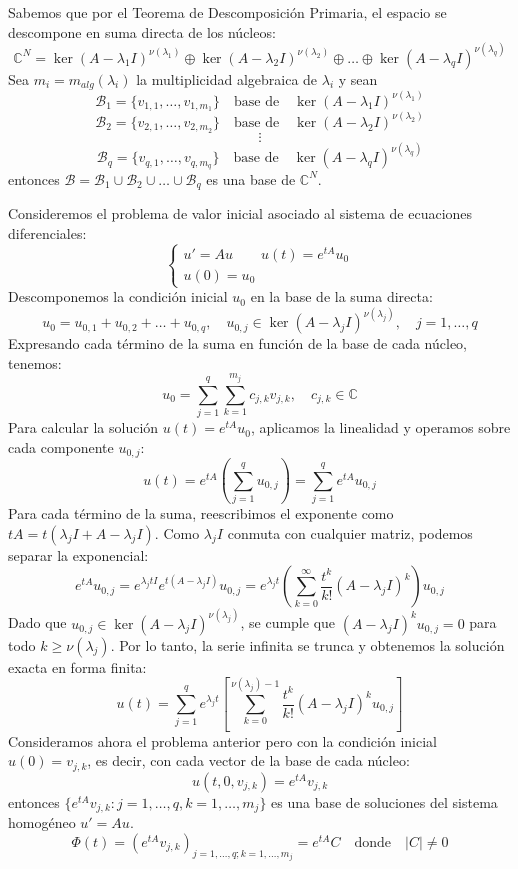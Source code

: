 Sabemos que por el Teorema de Descomposición Primaria, el espacio se descompone en suma directa de los núcleos:
\[
    \mathbb{C}^N = \ker(A - \lambda_1 I)^{\nu(\lambda_1)} \oplus \ker(A - \lambda_2 I)^{\nu(\lambda_2)} \oplus \dots \oplus \ker(A - \lambda_q I)^{\nu(\lambda_q)}
\]
Sea $m_i = m_{alg}(\lambda_i)$ la multiplicidad algebraica de $\lambda_i$ y sean
\[
    \mathcal{B}_1 = \{v_{1,1}, \dots, v_{1,m_1}\} \quad \text{base de} \quad \ker(A - \lambda_1 I)^{\nu(\lambda_1)}
\]
\[
    \mathcal{B}_2 = \{v_{2,1}, \dots, v_{2,m_2}\} \quad \text{base de} \quad \ker(A - \lambda_2 I)^{\nu(\lambda_2)}
\]
\[
    \vdots
\]
\[
    \mathcal{B}_q = \{v_{q,1}, \dots, v_{q,m_q}\} \quad \text{base de} \quad \ker(A - \lambda_q I)^{\nu(\lambda_q)}
\]
entonces $\mathcal{B} = \mathcal{B}_1 \cup \mathcal{B}_2 \cup \dots \cup \mathcal{B}_q$ es una base de $\mathbb{C}^N$.

Consideremos el problema de valor inicial asociado al sistema de ecuaciones diferenciales:
\[
    \begin{cases}
        u' = A u \qquad u(t) = e^{tA} u_0 \\
        u(0) = u_0
    \end{cases}
\]
Descomponemos la condición inicial $u_0$ en la base de la suma directa:
\[
    u_0 = u_{0,1} + u_{0,2} + \dots + u_{0,q}, \quad u_{0,j} \in \ker(A - \lambda_j I)^{\nu(\lambda_j)}, \quad j = 1, \dots, q
\]
Expresando cada término de la suma en función de la base de cada núcleo, tenemos:
\[
    u_0 = \sum_{j=1}^q \sum_{k=1}^{m_j} c_{j,k} v_{j,k}, \quad c_{j,k} \in \mathbb{C}
\]
Para calcular la solución $u(t) = e^{tA} u_0$, aplicamos la linealidad y operamos sobre cada componente $u_{0,j}$:
\[
    u(t) = e^{tA} \left( \sum_{j=1}^q u_{0,j} \right) = \sum_{j=1}^q e^{tA} u_{0,j}
\]
Para cada término de la suma, reescribimos el exponente como $tA = t(\lambda_j I + A - \lambda_j I)$. Como $\lambda_j I$ conmuta con cualquier matriz, podemos separar la exponencial:
\[
    e^{tA} u_{0,j} = e^{\lambda_j t I} e^{t(A - \lambda_j I)} u_{0,j} = e^{\lambda_j t} \left( \sum_{k=0}^{\infty} \frac{t^k}{k!} (A - \lambda_j I)^k \right) u_{0,j}
\] 
Dado que $u_{0,j} \in \ker(A - \lambda_j I)^{\nu(\lambda_j)}$, se cumple que $(A - \lambda_j I)^k u_{0,j} = 0$ para todo $k \geq \nu(\lambda_j)$. Por lo tanto, la serie infinita se trunca y obtenemos la solución exacta en forma finita:
\[
    u(t) = \sum_{j=1}^q e^{\lambda_j t} \left[ \sum_{k=0}^{\nu(\lambda_j)-1} \frac{t^k}{k!} (A - \lambda_j I)^k u_{0,j} \right]
\]
Consideramos ahora el problema anterior pero con la condición inicial $u(0) = v_{j,k}$, es decir, con cada vector de la base de cada núcleo:
\[
    u(t,0,v_{j,k}) = e^{tA} v_{j,k}
\]
entonces $\{e^{tA} v_{j,k} : j = 1, \dots, q, k = 1, \dots, m_j\}$ es una base de soluciones del sistema homogéneo $u' = A u$.
\[
    \Phi(t) = (e^{tA} v_{j,k})_{j=1,\dots,q; k=1,\dots,m_j} = e^{tA} C \quad \text{donde} \quad |C| \neq 0
\]
